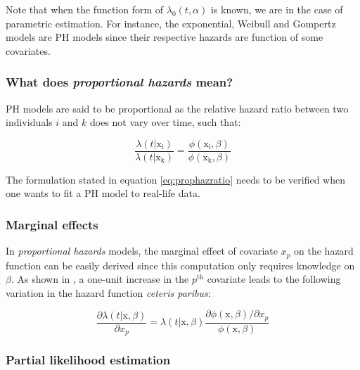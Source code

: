 \documentclass[
]{book}
\begin{document}
Note that when the function form of \(\lambda_0 (t,\alpha)\) is known, we are in the case of parametric estimation. For instance, the exponential, Weibull and Gompertz models are PH models since their respective hazards are function of some covariates.

\hypertarget{what-does-proportional-hazards-mean}{%
\subsubsection*{\texorpdfstring{What does \emph{proportional hazards} mean?}{What does proportional hazards mean?}}\label{what-does-proportional-hazards-mean}}

PH models are said to be proportional as the relative hazard ratio between two individuals \(i\) and \(k\) does not vary over time, such that:

\begin{equation}
  \frac{\lambda(t|\mathrm{x_i})}{\lambda(t|\mathrm{x_k})} = \frac{\phi(\mathrm{x_i}, \beta) }{\phi(\mathrm{x_k}, \beta)}
  \label{eq:prophazratio}
\end{equation}

The formulation stated in equation \eqref{eq:prophazratio} needs to be verified when one wants to fit a PH model to real-life data.

\hypertarget{marginal-effects}{%
\subsubsection*{Marginal effects}\label{marginal-effects}}

In \emph{proportional hazards} models, the marginal effect of covariate \(x_p\) on the hazard function can be easily derived since this computation only requires knowledge on \(\beta\). As shown in \citet{CAMERON_TRIVEDI}, a one-unit increase in the \(p^{\text{th}}\) covariate leads to the following variation in the hazard function \emph{ceteris paribus}:

\begin{equation}
    \frac{\partial \lambda(t|\pmb{\mathrm{x}}, \beta)}{\partial x_p} = \lambda(t|\pmb{\mathrm{x}}, \beta) \frac{\partial \phi(\pmb{\mathrm{x}}, \beta) / \partial x_p}{\phi(\pmb{\mathrm{x}}, \beta) }
    \label{eq:meph}
\end{equation}

\hypertarget{partial-likelihood-estimation}{%
\subsubsection*{Partial likelihood estimation}\label{partial-likelihood-estimation}}
\end{document}
